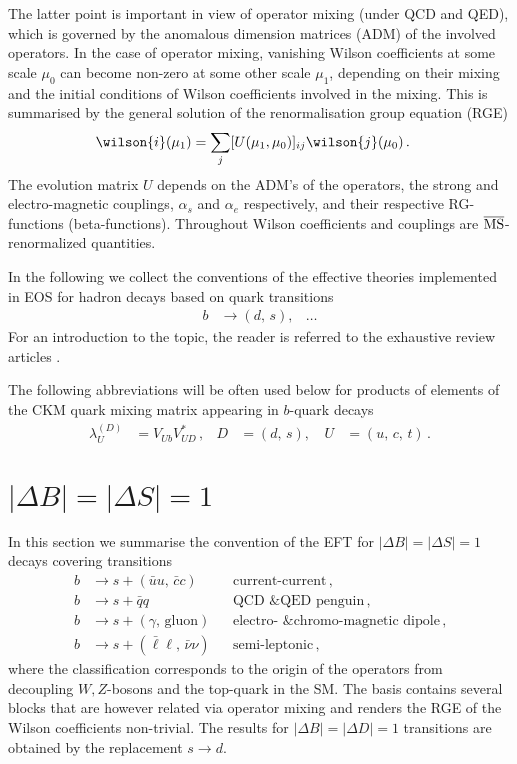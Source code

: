 The latter point
is important in view of operator mixing (under QCD and QED), which is governed by
the anomalous dimension matrices (ADM) of the involved operators. In the case of
operator mixing, vanishing Wilson coefficients at some scale $\mu_0$ can become 
non-zero at some other scale $\mu_1$, depending on their mixing and the initial
conditions of Wilson coefficients involved in the mixing. This is summarised
by the general solution of the renormalisation group equation (RGE)
\begin{align}
  \wilson{i}(\mu_1) & = \sum_j [U(\mu_1, \mu_0)]_{ij} \wilson{j}(\mu_0)\,.
\end{align}
The evolution matrix $U$ depends on the ADM's of the operators, the strong
and electro-magnetic couplings, $\alpha_s$ and $\alpha_e$ respectively, and
their respective RG-functions (beta-functions). Throughout Wilson coefficients
and couplings are $\overline{\rm MS}$-renormalized quantities.

In the following we collect the conventions of the effective theories implemented
in EOS for hadron decays based on quark transitions
\begin{align}
  b & \to (d,\, s), & \ldots
\end{align}
For an introduction to the topic, the reader is referred to the exhaustive review
articles \cite{Buchalla:1995vs, Buras:1998raa}. 

The following abbreviations will be often used below for products of elements
of the CKM quark mixing matrix appearing in $b$-quark decays
\begin{align}
  \lambda_U^{(D)} & = V_{Ub}^{} V_{UD}^* \,, &
  D & = (d,\,s), \, &
  U & = (u,\,c,\,t) \,.
\end{align}

%
%

\section{$|\Delta B| = |\Delta S| = 1$}

In this section we summarise the convention of the EFT for $|\Delta B| = |\Delta S| = 1$
decays covering transitions
\begin{align*}
  b & \to s + (\bar{u}u,\, \bar{c}c)           && \mbox{current-current} \,,
\\
  b & \to s + \bar{q}q                         && \mbox{QCD \& QED penguin} \,,
\\
  b & \to s + (\gamma,\, \mbox{gluon})         && \mbox{electro- \& chromo-magnetic dipole} \,,
\\
  b & \to s + (\bar{\ell}\ell,\, \bar{\nu}\nu) && \mbox{semi-leptonic} \,,
\end{align*}
where the classification corresponds to the origin of the operators from 
decoupling $W,Z$-bosons and the top-quark in the SM. The basis contains several
blocks that are however related via operator mixing and renders the RGE of the
Wilson coefficients non-trivial. The results for $|\Delta B| = |\Delta D| = 1$
transitions are obtained by the replacement $s\to d$.
 
